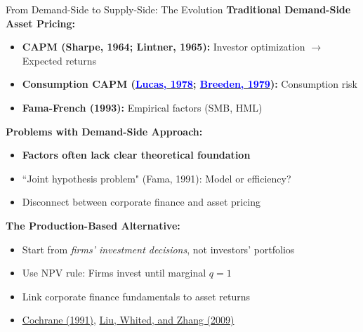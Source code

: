 \documentclass{beamer}
\begin{document}
\begin{frame}{From Demand-Side to Supply-Side: The Evolution}
    \textbf{Traditional Demand-Side Asset Pricing:}
    \begin{itemize}
        \item \textbf{CAPM (Sharpe, 1964; Lintner, 1965):} Investor optimization $\rightarrow$ Expected returns
        \item \textbf{Consumption CAPM (\href{https://www.jstor.org/stable/1913837}{\textcolor{blue}{Lucas, 1978}}; \href{https://www.sciencedirect.com/science/article/pii/0304405X79900163}{\textcolor{blue}{Breeden, 1979}}):} Consumption risk
        \item \textbf{Fama-French (1993):} Empirical factors (SMB, HML)
    \end{itemize}
    
    
    \textbf{Problems with Demand-Side Approach:}
    \begin{itemize}
        \item \textbf{Factors often lack clear theoretical foundation}
        \item ``Joint hypothesis problem" (Fama, 1991): Model or efficiency?
        \item Disconnect between corporate finance and asset pricing
    \end{itemize}
    
    
    \textbf{The Production-Based Alternative:}
    \begin{itemize}
        \item Start from \textit{firms' investment decisions}, not investors' portfolios
        \item Use NPV rule: Firms invest until marginal $q = 1$
        \item Link corporate finance fundamentals to asset returns
        \item \textcolor{blue}{\href{https://doi.org/10.1111/j.1540-6261.1991.tb03750.x }{Cochrane (1991)}}, \textcolor{blue}{\href{https://doi.org/10.1086/649760}{Liu, Whited, and Zhang (2009)}}
    \end{itemize}
\end{frame}
\end{document}
